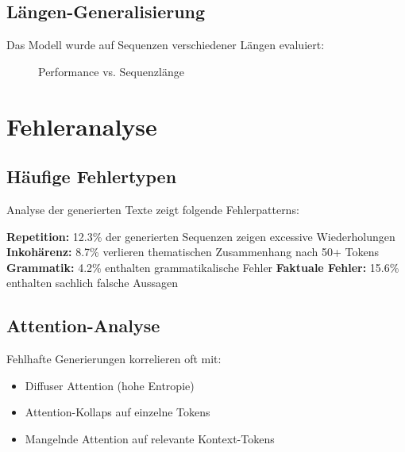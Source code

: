 \subsection{Längen-Generalisierung}

Das Modell wurde auf Sequenzen verschiedener Längen evaluiert:

\begin{figure}[h]
\centering
{}
\caption{Performance vs. Sequenzlänge}
\label{fig:length_generalization}
\end{figure}

\section{Fehleranalyse}

\subsection{Häufige Fehlertypen}

Analyse der generierten Texte zeigt folgende Fehlerpatterns:

\textbf{Repetition:} 12.3\% der generierten Sequenzen zeigen excessive Wiederholungen
\textbf{Inko\-härenz:} 8.7\% verlieren thematischen Zusammenhang nach 50+ Tokens
\textbf{Grammatik:} 4.2\% enthalten grammatikalische Fehler
\textbf{Faktuale Fehler:} 15.6\% enthalten sachlich falsche Aussagen

\subsection{Attention-Analyse}

Fehlhafte Generierungen korrelieren oft mit:
\begin{itemize}
    \item Diffuser Attention (hohe Entropie)
    \item Attention-Kollaps auf einzelne Tokens
    \item Mangelnde Attention auf relevante Kontext-Tokens
\end{itemize}

